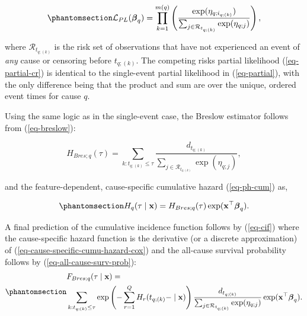\documentclass[
  letterpaper,
  krantz2]{style/krantz}
\begin{document}
\begin{equation}\phantomsection\label{eq-partial-cr}{
\mathcal{L}_{PL}(\boldsymbol{\beta}_q) = \prod_{k=1}^{m(q)} \left(\frac{\exp(\eta_{q;i_{q;(k)}})}{\sum_{j \in \mathcal{R}_{t_{q;(k)}}} \exp(\eta_{q;j})}\right),
}\end{equation}

where \(\mathcal{R}_{t_{q;(k)}}\) is the risk set of observations that
have not experienced an event of \emph{any} cause or censoring before
\(t_{q;(k)}\). The competing risks partial likelihood
(\ref{eq-partial-cr}) is identical to the single-event partial
likelihood in (\ref{eq-partial}), with the only difference being that
the product and sum are over the unique, ordered event times for cause
\(q\). 

Using the same logic as in the single-event case, the Breslow estimator
follows from (\ref{eq-breslow}):

\[
H_{Bres;q}(\tau) = \sum_{k:t_{q;(k)}\leq \tau} \frac{d_{t_{q;(k)}}}{\sum_{j \in \mathcal{R}_{t_{q;(k)}}} \exp(\eta_{q;j})},
\]

and the feature-dependent, cause-specific cumulative hazard
(\ref{eq-ph-cum}) as,

\begin{equation}\phantomsection\label{eq-cause-specific-cumu-hazard-cox}{
H_{q}(\tau \mid \mathbf{x}) = H_{Bres;q}(\tau)\exp(\mathbf{x}^\top\boldsymbol{\beta}_q).
}\end{equation}

A final prediction of the cumulative incidence
function follows by (\ref{eq-cif})
where the cause-specific hazard
function is the derivative (or a
discrete approximation) of (\ref{eq-cause-specific-cumu-hazard-cox}) and
the all-cause survival probability
follows by (\ref{eq-all-cause-surv-prob}):
\begin{equation}\phantomsection\label{eq-cif-cox}{
\begin{aligned}
&F_{Bres;q}(\tau \mid \mathbf{x}) = \\
&\sum_{k:t_{q;(k)}\leq \tau} \exp\left(-\sum_{r=1}^Q H_{r}(t_{q;(k)}- \mid \mathbf{x})\right) \frac{d_{t_{q;(k)}}}{\sum_{j \in \mathcal{R}_{t_{q;(k)}}} \exp(\eta_{q;j})}\exp(\mathbf{x}^\top\boldsymbol{\beta}_q).
\end{aligned}
}\end{equation}
\end{document}
